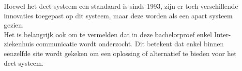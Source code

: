 Hoewel het \gls{dect}-systeem een standaard is sinds 1993, zijn er toch verschillende innovaties toegepast op dit systeem, maar deze worden als een apart systeem gezien. 
\\Het is belangrijk ook om te vermelden dat in deze bachelorproef enkel Inter-ziekenhuis communicatie wordt onderzocht. Dit betekent dat enkel binnen eenzelfde site wordt gekeken om een oplossing of alternatief te bieden voor het \gls{dect}-systeem.

\section{}%
\label{sec:req}%











